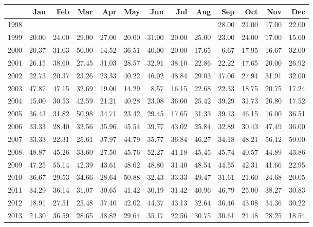 \begin{longtable}{rrrrrrrrrrrrr}
  \hline
 & Jan & Feb & Mar & Apr & May & Jun & Jul & Aug & Sep & Oct & Nov & Dec \\ 
  \hline
1998 &  &  &  &  &  &  &  &  & 28.00 & 21.00 & 17.00 & 22.00 \\ 
  1999 & 20.00 & 24.00 & 29.00 & 27.00 & 20.00 & 31.00 & 20.00 & 25.00 & 23.00 & 24.00 & 17.00 & 15.00 \\ 
  2000 & 20.37 & 31.03 & 50.00 & 14.52 & 36.51 & 40.00 & 20.00 & 17.65 & 6.67 & 17.95 & 16.67 & 32.00 \\ 
  2001 & 26.15 & 38.60 & 27.45 & 31.03 & 28.57 & 32.91 & 38.10 & 22.86 & 22.22 & 17.65 & 20.00 & 26.92 \\ 
  2002 & 22.73 & 20.37 & 23.26 & 23.33 & 40.22 & 46.02 & 48.84 & 29.03 & 47.06 & 27.94 & 31.91 & 32.00 \\ 
  2003 & 47.87 & 47.15 & 32.69 & 19.00 & 14.29 & 8.57 & 16.15 & 22.68 & 22.33 & 18.75 & 20.75 & 17.24 \\ 
  2004 & 15.00 & 30.53 & 42.59 & 21.21 & 40.28 & 23.08 & 36.00 & 25.42 & 39.29 & 31.73 & 26.80 & 17.52 \\ 
  2005 & 36.43 & 31.82 & 50.98 & 34.71 & 23.42 & 29.45 & 17.65 & 31.33 & 39.13 & 46.15 & 16.00 & 36.51 \\ 
  2006 & 33.33 & 28.40 & 32.56 & 35.96 & 45.54 & 39.77 & 43.02 & 25.84 & 32.89 & 30.43 & 47.49 & 36.00 \\ 
  2007 & 33.33 & 22.31 & 25.61 & 37.97 & 44.79 & 35.77 & 36.84 & 46.27 & 34.18 & 48.21 & 56.12 & 50.00 \\ 
  2008 & 48.87 & 45.26 & 33.60 & 27.50 & 45.76 & 52.27 & 41.18 & 45.45 & 45.74 & 40.57 & 44.89 & 43.86 \\ 
  2009 & 47.25 & 55.14 & 42.39 & 43.61 & 48.62 & 48.80 & 31.40 & 48.54 & 44.55 & 42.31 & 41.66 & 22.95 \\ 
  2010 & 36.67 & 29.53 & 34.66 & 28.64 & 50.88 & 32.43 & 33.33 & 49.47 & 31.61 & 21.60 & 24.68 & 20.05 \\ 
  2011 & 34.29 & 36.14 & 31.07 & 30.65 & 41.42 & 30.19 & 31.42 & 40.96 & 46.79 & 25.00 & 38.27 & 30.83 \\ 
  2012 & 18.91 & 27.51 & 25.48 & 37.40 & 42.02 & 44.37 & 43.13 & 32.64 & 36.46 & 43.08 & 34.36 & 30.22 \\ 
  2013 & 24.30 & 36.59 & 28.65 & 38.82 & 29.64 & 35.17 & 22.56 & 30.75 & 30.61 & 21.48 & 28.25 & 18.54 \\ 

\end{longtable}
